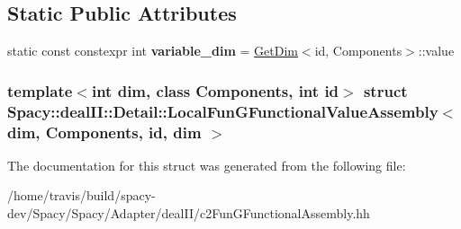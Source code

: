 \subsection*{\-Static \-Public \-Attributes}
\begin{DoxyCompactItemize}
\item 
\hypertarget{structSpacy_1_1dealII_1_1Detail_1_1LocalFunGFunctionalValueAssembly_3_01dim_00_01Components_00_01id_00_01dim_01_4_a185c176fadc7dd8d36a2a310936ea7b9}{static const constexpr int {\bfseries variable\-\_\-dim} = \hyperlink{structSpacy_1_1dealII_1_1GetDim}{\-Get\-Dim}$<$id, \-Components$>$\-::value}\label{structSpacy_1_1dealII_1_1Detail_1_1LocalFunGFunctionalValueAssembly_3_01dim_00_01Components_00_01id_00_01dim_01_4_a185c176fadc7dd8d36a2a310936ea7b9}

\end{DoxyCompactItemize}
\subsubsection*{template$<$int dim, class Components, int id$>$ struct Spacy\-::deal\-I\-I\-::\-Detail\-::\-Local\-Fun\-G\-Functional\-Value\-Assembly$<$ dim, Components, id, dim $>$}



\-The documentation for this struct was generated from the following file\-:\begin{DoxyCompactItemize}
\item 
/home/travis/build/spacy-\/dev/\-Spacy/\-Spacy/\-Adapter/deal\-I\-I/c2\-Fun\-G\-Functional\-Assembly.\-hh\end{DoxyCompactItemize}
